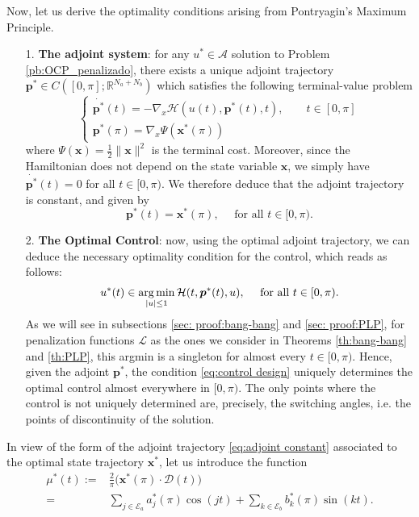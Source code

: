 \documentclass[9pt,shortpaper,twoside,web]{ieeecolor}
\begin{document}
Now, let us derive the optimality conditions arising from Pontryagin's Maximum Principle.
\begin{itemize}
	\item[1.] \textbf{The adjoint system}: for any $u^\ast \in \mathcal{A}$ solution to Problem \ref{pb:OCP_penalizado}, there exists a unique adjoint trajectory $\bm{p}^\ast\in C([0,\pi]; \mathbb{R}^{N_a+N_b})$ which satisfies the following terminal-value problem
	\begin{equation*}
		\begin{cases}
			\dot{\bm{p}^\ast}(t) = -\nabla_x \mathcal{H}(u(t),\bm{p}^\ast(t),t), \qquad t \in [0,\pi] 
			\\[5pt]
			\bm{p}^\ast (\pi) = \nabla_x \Psi (\bm{x}^\ast (\pi))
		\end{cases}
	\end{equation*}
	where $\Psi (\bm{x}) = \frac{1}{2} \| \bm{x}\|^2$ is the terminal cost. Moreover, since the Hamiltonian does not depend on the state variable $\bm{x}$, we simply have $\dot{\bm{p}^\ast}(t) = 0$ for all $t \in [0,\pi)$. We therefore deduce that the adjoint trajectory is constant, and given by
	\begin{equation}\label{eq:adjoint constant}
		\bm{p}^\ast (t) = \bm{x}^\ast (\pi), \quad \text{ for all } t \in [0,\pi). 
	\end{equation}
	
	\item[2.] \textbf{The Optimal  Control}: now, using the optimal adjoint trajectory, we can deduce the necessary optimality condition for the control, which reads as follows:
	\begin{align}\label{eq:control design}
		u^* (t) \in \operatorname*{arg\,min}_{|u|\leq 1} \mathcal{H}(t,\bm{p}^*(t),u), \quad \text{ for all } t \in [0,\pi).
	\end{align}
	As we will see in subsections \ref{sec: proof:bang-bang} and \ref{sec: proof:PLP}, for penalization functions $\mathcal{L}$ as the ones we consider in Theorems \ref{th:bang-bang} and \ref{th:PLP}, this argmin is a singleton for almost every $t\in [0,\pi)$.  
	Hence, given the adjoint $\bm{p}^\ast$,  the condition \eqref{eq:control design} uniquely determines the optimal control almost everywhere in $[0,\pi)$. The only points where the control is not uniquely determined are, precisely, the switching angles, i.e. the points of discontinuity of the solution.
\end{itemize}

In view of the form of the adjoint trajectory \eqref{eq:adjoint constant} associated to the optimal state trajectory $\bm{x}^\ast$, let us introduce the function
\begin{align}\label{eq:m ast}
	\mu^\ast (t) := & \frac 2\pi \big(\bm{x}^*(\pi) \cdot \bm{\mathcal{D}}(t)\big) 
	\\[5pt]
	= & \sum_{j \in \mathcal{E}_a} a^*_j (\pi) \cos(jt) + \sum_{k \in \mathcal{E}_b} b^*_k (\pi) \sin(kt). \nonumber
\end{align}
\end{document}
